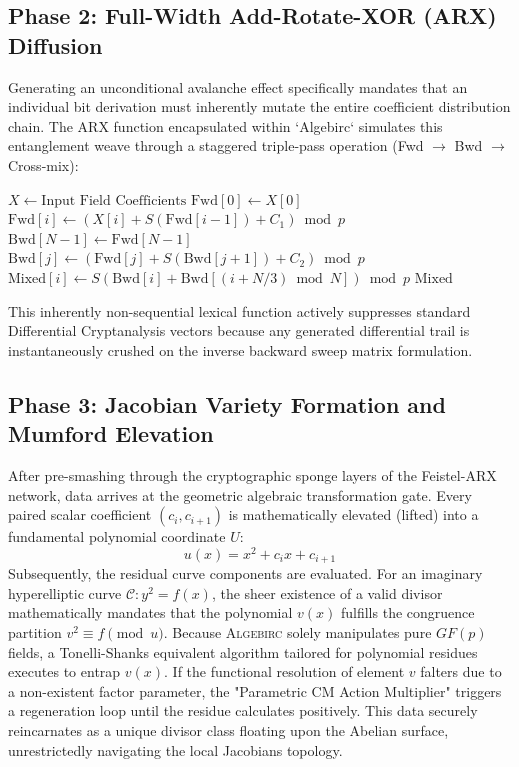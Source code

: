 \subsection{Phase 2: Full-Width Add-Rotate-XOR (ARX) Diffusion}
Generating an unconditional avalanche effect specifically mandates that an individual bit derivation must inherently mutate the entire coefficient distribution chain. The ARX function encapsulated within `Algebirc` simulates this entanglement weave through a staggered triple-pass operation (Fwd $\to$ Bwd $\to$ Cross-mix):
\begin{algorithm}[H]
\caption{ARX Coefficient Diffusion over $GF(p)$}
\begin{algorithmic}[1]
\State $X \gets \text{Input Field Coefficients}$
\State $\text{Fwd}[0] \gets X[0]$
    \State $\text{Fwd}[i] \gets (X[i] + S(\text{Fwd}[i-1]) + C_1) \bmod p$
\EndFor
\State $\text{Bwd}[N-1] \gets \text{Fwd}[N-1]$
    \State $\text{Bwd}[j] \gets (\text{Fwd}[j] + S(\text{Bwd}[j+1]) + C_2) \bmod p$
\EndFor
\State $\text{Mixed}[i] \gets S(\text{Bwd}[i] + \text{Bwd}[(i + N/3) \bmod N]) \bmod p$
\State \Return $\text{Mixed}$
\end{algorithmic}
\label{alg:arx}
\end{algorithm}
This inherently non-sequential lexical function actively suppresses standard Differential Cryptanalysis vectors because any generated differential trail is instantaneously crushed on the inverse backward sweep matrix formulation.

\subsection{Phase 3: Jacobian Variety Formation and Mumford Elevation}
After pre-smashing through the cryptographic sponge layers of the Feistel-ARX network, data arrives at the geometric algebraic transformation gate. Every paired scalar coefficient $(c_i, c_{i+1})$ is mathematically elevated (lifted) into a fundamental polynomial coordinate $U$:
\begin{equation}
    u(x) = x^2 + c_i x + c_{i+1}
\end{equation}
Subsequently, the residual curve components are evaluated. For an imaginary hyperelliptic curve $\mathcal{C}: y^2 = f(x)$, the sheer existence of a valid divisor mathematically mandates that the polynomial $v(x)$ fulfills the congruence partition $v^2 \equiv f \pmod u$. Because \textsc{Algebirc} solely manipulates pure $GF(p)$ fields, a Tonelli-Shanks equivalent algorithm tailored for polynomial residues executes to entrap $v(x)$. If the functional resolution of element $v$ falters due to a non-existent factor parameter, the "Parametric CM Action Multiplier" triggers a regeneration loop until the residue calculates positively. This data securely reincarnates as a unique divisor class floating upon the Abelian surface, unrestrictedly navigating the local Jacobians topology.

